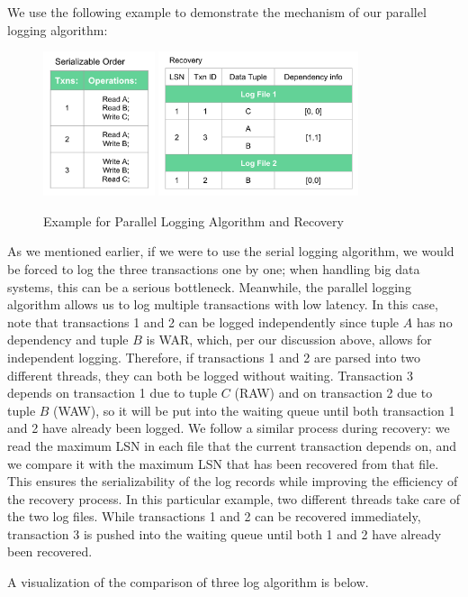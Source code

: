 We use the following example to demonstrate the mechanism of our parallel logging algorithm: 
\begin{figure}[!h]
\caption{Example for Parallel Logging Algorithm and Recovery}
\centering
\includegraphics[height=120pt]{Parallel.png}
\hspace{20pt}
\includegraphics[height=120pt]{Parallel_re.png}
\end{figure}\par
As we mentioned earlier, if we were to use the serial logging algorithm, we would be forced to log the three transactions one by one; when handling big data systems, this can be a serious bottleneck. Meanwhile, the parallel logging algorithm allows us to log multiple transactions with low latency. In this case, note that transactions 1 and 2 can be logged independently since tuple $A$ has no dependency and tuple $B$ is WAR, which, per our discussion above, allows for independent logging. Therefore, if transactions 1 and 2 are parsed into two different threads, they can both be logged without waiting. Transaction 3 depends on transaction 1 due to tuple $C$ (RAW) and on transaction 2 due to tuple $B$ (WAW), so it will be put into the waiting queue until both transaction 1 and 2 have already been logged. 
We follow a similar process during recovery: we read the maximum LSN in each file that the current transaction depends on, and we compare it with the maximum LSN that has been recovered from that file. This ensures the serializability of the log records while improving the efficiency of the recovery process. In this particular example, two different threads take care of the two log files. While transactions 1 and 2 can be recovered immediately, transaction 3 is pushed into the waiting queue until both 1 and 2 have already been recovered.\par
A visualization of the comparison of three log algorithm is below.  
